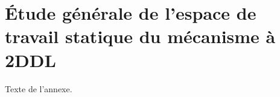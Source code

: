 \chapter{Étude générale de l'espace de travail statique du mécanisme à 2DDL}     %

Texte de l'annexe.